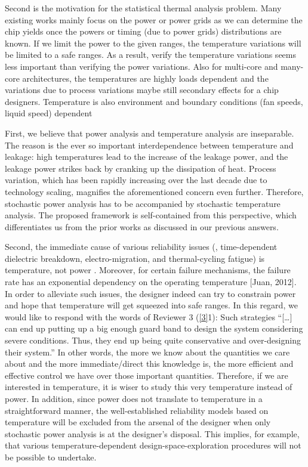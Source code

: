 \begin{reviewer}
Second is the motivation for the statistical thermal analysis problem. Many existing works mainly focus on the power or power grids as we can determine the chip yields once the powers or timing (due to power grids) distributions are known. If we limit the power to the given ranges, the temperature variations will be limited to a safe ranges. As a result, verify the temperature variations seems less important than verifying the power variations. Also for multi-core and many-core architectures, the temperatures are highly loads dependent and the variations due to process variations maybe still secondary effects for a chip designers. Temperature is also environment and boundary conditions (fan speeds, liquid speed) dependent
\end{reviewer}
\begin{authors}
First, we believe that power analysis and temperature analysis are inseparable.
The reason is the ever so important interdependence between temperature and leakage: high temperatures lead to the increase of the leakage power, and the leakage power strikes back by cranking up the dissipation of heat.
Process variation, which has been rapidly increasing over the last decade due to technology scaling, magnifies the aforementioned concern even further.
Therefore, stochastic power analysis has to be accompanied by stochastic temperature analysis.
The proposed framework is self-contained from this perspective, which differentiates us from the prior works as discussed in our previous answers.

Second, the immediate cause of various reliability issues (\eg, time-dependent dielectric breakdown, electro-migration, and thermal-cycling fatigue) is temperature, not power \perse.
Moreover, for certain failure mechanisms, the failure rate has an exponential dependency on the operating temperature [Juan, 2012].
In order to alleviate such issues, the designer indeed can try to constrain power and hope that temperature will get squeezed into safe ranges.
In this regard, we would like to respond with the words of Reviewer 3 (\cref{3}{1}):
Such strategies ``[\ldots] can end up putting up a big enough guard band to design the system considering severe conditions.
Thus, they end up being quite conservative and over-designing their system.''
In other words, the more we know about the quantities we care about and the more immediate/direct this knowledge is, the more efficient and effective control we have over those important quantities.
Therefore, if we are interested in temperature, it is wiser to study this very temperature instead of power.
In addition, since power does not translate to temperature in a straightforward manner, the well-established reliability models based on temperature will be excluded from the arsenal of the designer when only stochastic power analysis is at the designer's disposal.
This implies, for example, that various temperature-dependent design-space-exploration procedures will not be possible to undertake.


\end{authors}
